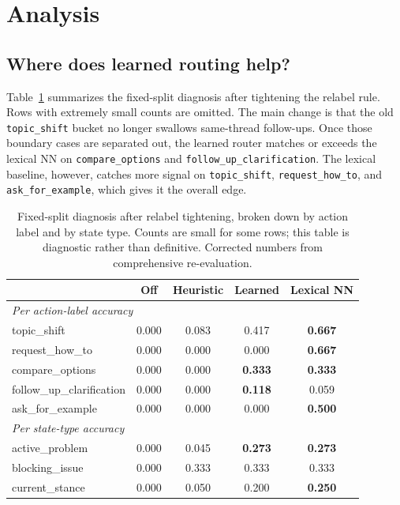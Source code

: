 \section{Analysis}

\subsection{Where does learned routing help?}

Table~\ref{tab:diagnosis} summarizes the fixed-split diagnosis after tightening the relabel rule. Rows with extremely small counts are omitted. The main change is that the old \texttt{topic\_shift} bucket no longer swallows same-thread follow-ups. Once those boundary cases are separated out, the learned router matches or exceeds the lexical NN on \texttt{compare\_options} and \texttt{follow\_up\_clarification}. The lexical baseline, however, catches more signal on \texttt{topic\_shift}, \texttt{request\_how\_to}, and \texttt{ask\_for\_example}, which gives it the overall edge.

\begin{table}[tbp]
\centering
\small
\begin{tabular}{lcccc}
\toprule
& Off & Heuristic & Learned & Lexical NN \\
\midrule
\multicolumn{5}{l}{\textit{Per action-label accuracy}} \\
\midrule
topic\_shift & 0.000 & 0.083 & 0.417 & \textbf{0.667} \\
request\_how\_to & 0.000 & 0.000 & 0.000 & \textbf{0.667} \\
compare\_options & 0.000 & 0.000 & \textbf{0.333} & \textbf{0.333} \\
follow\_up\_clarification & 0.000 & 0.000 & \textbf{0.118} & 0.059 \\
ask\_for\_example & 0.000 & 0.000 & 0.000 & \textbf{0.500} \\
\midrule
\multicolumn{5}{l}{\textit{Per state-type accuracy}} \\
\midrule
active\_problem & 0.000 & 0.045 & \textbf{0.273} & \textbf{0.273} \\
blocking\_issue & 0.000 & 0.333 & 0.333 & 0.333 \\
current\_stance & 0.000 & 0.050 & 0.200 & \textbf{0.250} \\
\bottomrule
\end{tabular}
\caption{Fixed-split diagnosis after relabel tightening, broken down by action label and by state type. Counts are small for some rows; this table is diagnostic rather than definitive. Corrected numbers from comprehensive re-evaluation.}
\label{tab:diagnosis}
\end{table}

